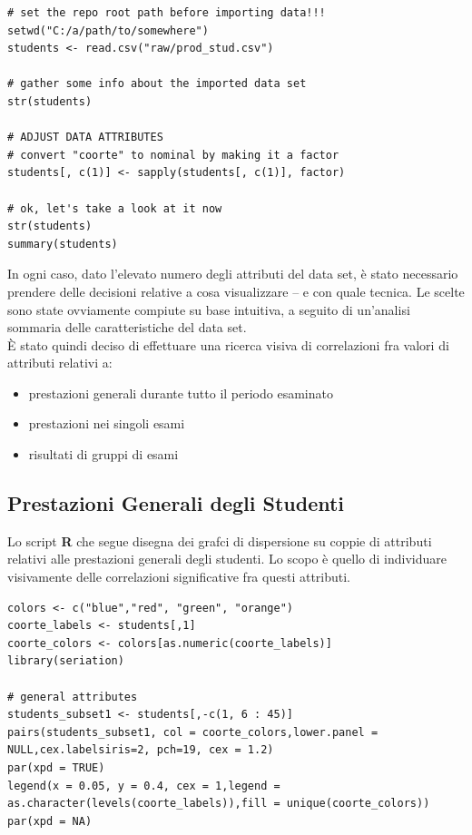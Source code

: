         \begin{lstlisting}
# set the repo root path before importing data!!!
setwd("C:/a/path/to/somewhere")
students <- read.csv("raw/prod_stud.csv")

# gather some info about the imported data set
str(students)

# ADJUST DATA ATTRIBUTES
# convert "coorte" to nominal by making it a factor
students[, c(1)] <- sapply(students[, c(1)], factor)

# ok, let's take a look at it now
str(students)
summary(students)
        \end{lstlisting}

        In ogni caso, dato l’elevato numero degli attributi del data set, è stato necessario prendere delle decisioni relative a cosa visualizzare – e con quale tecnica. Le scelte sono state ovviamente compiute su base intuitiva, a seguito di un’analisi sommaria delle caratteristiche del data set. \\

        È stato quindi deciso di effettuare una ricerca visiva di correlazioni fra valori di attributi relativi a:

        \begin{itemize}
            \item prestazioni generali durante tutto il periodo esaminato
            \item prestazioni nei singoli esami
            \item risultati di gruppi di esami
        \end{itemize}

        \subsection{Prestazioni Generali degli Studenti}

            Lo script \textbf{R} che segue disegna dei grafci di dispersione su coppie di attributi relativi alle prestazioni generali degli studenti. Lo scopo è quello di individuare visivamente delle correlazioni significative fra questi attributi.\\

            \begin{lstlisting}
colors <- c("blue","red", "green", "orange")
coorte_labels <- students[,1]
coorte_colors <- colors[as.numeric(coorte_labels)]
library(seriation)

# general attributes
students_subset1 <- students[,-c(1, 6 : 45)]
pairs(students_subset1, col = coorte_colors,lower.panel = 	NULL,cex.labelsiris=2, pch=19, cex = 1.2)
par(xpd = TRUE)
legend(x = 0.05, y = 0.4, cex = 1,legend = 	as.character(levels(coorte_labels)),fill = unique(coorte_colors))
par(xpd = NA)
            \end{lstlisting}

